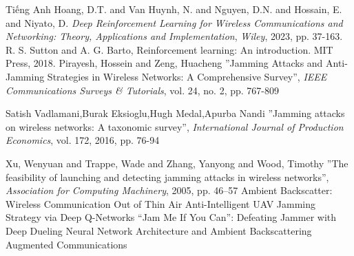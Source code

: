 \documentclass{uetgraduation}
\begin{document}
\begin{thebibliography}{9}
\begin{bibsection}{Tiếng Anh}
    Hoang, D.T. and Van Huynh, N. and Nguyen, D.N. and Hossain, E. and Niyato, D.
    \textit{Deep Reinforcement Learning for Wireless Communications and Networking: Theory, Applications and Implementation},
    \textit{Wiley}, 2023, pp. 37-163.
    R. S. Sutton and A. G. Barto, Reinforcement learning: An introduction.
    MIT Press, 2018.
    Pirayesh, Hossein and Zeng, Huacheng
    ''Jamming Attacks and Anti-Jamming Strategies in Wireless Networks: A Comprehensive Survey'',
    \textit{IEEE Communications Surveys \& Tutorials},
    vol. 24, no. 2,
    pp. 767-809

    Satish Vadlamani,Burak Eksioglu,Hugh Medal,Apurba Nandi
    ''Jamming attacks on wireless networks: A taxonomic survey'',
    \textit{International Journal of Production Economics},
    vol. 172,
    2016,
    pp. 76-94

    Xu, Wenyuan and Trappe, Wade and Zhang, Yanyong and Wood, Timothy
    ''The feasibility of launching and detecting jamming attacks in wireless networks'',
    \textit{Association for Computing Machinery},
    2005,
    pp. 46–57
    Ambient Backscatter: Wireless Communication Out of Thin Air
    Anti-Intelligent UAV Jamming Strategy via Deep Q-Networks
    “Jam Me If You Can”: Defeating Jammer with Deep Dueling Neural Network Architecture and Ambient Backscattering Augmented Communications
\end{bibsection}
\end{thebibliography}
\end{document}
